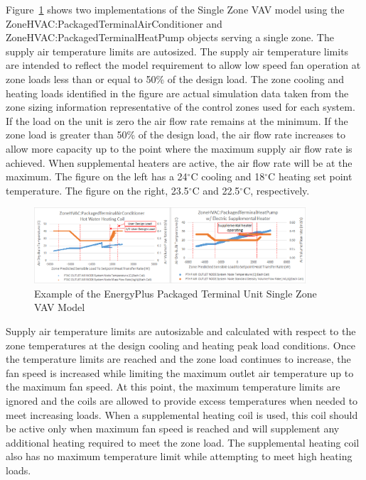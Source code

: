 Figure~\ref{fig:example-of-the-energyplus-packaged-terminal-unit-single-zone-vav-model} shows two implementations of the Single Zone VAV model using the ZoneHVAC:PackagedTerminalAirConditioner and ZoneHVAC:PackagedTerminalHeatPump objects serving a single zone. The supply air temperature limits are autosized. The supply air temperature limits are intended to reflect the model requirement to allow low speed fan operation at zone loads less than or equal to 50\% of the design load. The zone cooling and heating loads identified in the figure are actual simulation data taken from the zone sizing information representative of the control zones used for each system. If the load on the unit is zero the air flow rate remains at the minimum. If the zone load is greater than 50\% of the design load, the air flow rate increases to allow more capacity up to the point where the maximum supply air flow rate is achieved. When supplemental heaters are active, the air flow rate will be at the maximum. The figure on the left has a 24\(^{\circ}\)C cooling and 18\(^{\circ}\)C heating set point temperature. The figure on the right, 23.5\(^{\circ}\)C and 22.5\(^{\circ}\)C, respectively.

\begin{figure}[hbtp]
\centering
\includegraphics[width=0.9\textwidth, height=0.9\textheight, keepaspectratio=true]{media/PTUnit_SZVAV_FanControl.png}
\caption{Example of the EnergyPlus Packaged Terminal Unit Single Zone VAV Model \protect \label{fig:example-of-the-energyplus-packaged-terminal-unit-single-zone-vav-model}}
\end{figure}

Supply air temperature limits are autosizable and calculated with respect to the zone temperatures at the design cooling and heating peak load conditions. Once the temperature limits are reached and the zone load continues to increase, the fan speed is increased while limiting the maximum outlet air temperature up to the maximum fan speed. At this point, the maximum temperature limits are ignored and the coils are allowed to provide excess temperatures when needed to meet increasing loads. When a supplemental heating coil is used, this coil should be active only when maximum fan speed is reached and will supplement any additional heating required to meet the zone load. The supplemental heating coil also has no maximum temperature limit while attempting to meet high heating loads.

